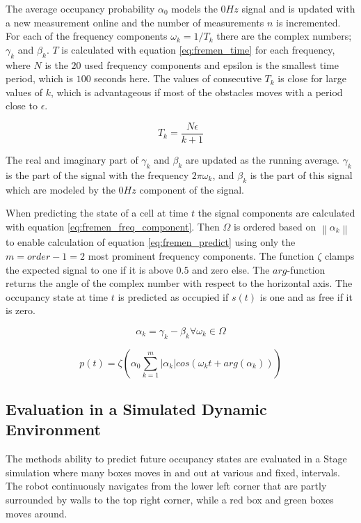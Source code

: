 The average occupancy probability $\alpha_0$ models the $0Hz$ signal and is updated with a new measurement online and the number of measurements $n$ is incremented. 
For each of the frequency components $\omega_k=1/T_k$ there are the complex numbers; $\gamma_k$ and $\beta_k$.
$T$ is calculated with equation \ref{eq:fremen_time} for each frequency, where $N$ is the $20$ used frequency components and epsilon is the smallest time period, which is $100$ seconds here. 
The values of consecutive $T_k$ is close for large values of $k$, which is advantageous if most of the obstacles moves with a period close to $\epsilon$.

\begin{equation}
T_k = \frac{N \epsilon}{k+1}
\label{eq:fremen_time}
\end{equation}

The real and imaginary part of $\gamma_k$ and $\beta_k$ are updated as the running average. $\gamma_k$ is the part of the signal with the frequency $2 \pi \omega_k$, and $\beta_k$ is the part of this signal which are modeled by the $0Hz$ component of the signal.

When predicting the state of a cell at time $t$ the signal components are calculated with equation \ref{eq:fremen_freq_component}.
Then $ \Omega $ is ordered based on $ \left\| \alpha_k \right\| $ to enable calculation of equation \ref{eq:fremen_predict} using only the $m=order-1=2$ most prominent frequency components.
The function $\zeta$ clamps the expected signal to one if it is above $0.5$ and zero else. The $arg$-function returns the angle of the complex number with respect to the horizontal axis.
The occupancy state at time $t$ is predicted as occupied if $s(t)$ is one and as free if it is zero.

\begin{equation}
\alpha_k = \gamma_k - \beta_k \forall \omega_k \in \Omega
\label{eq:fremen_freq_component}
\end{equation}

\begin{equation}
p(t) = \zeta \left( \alpha_0 \sum_{k=1}^{m} |\alpha_k| cos(\omega_k t + arg(\alpha_k))  \right)
\label{eq:fremen_predict}
\end{equation}

\subsection{Evaluation in a Simulated Dynamic Environment}
The methods ability to predict future occupancy states are evaluated in a Stage simulation where many boxes moves in and out at various and fixed, intervals. 
The robot continuously navigates from the lower left corner that are partly surrounded by walls to the top right corner, while a red box and green boxes moves around.

